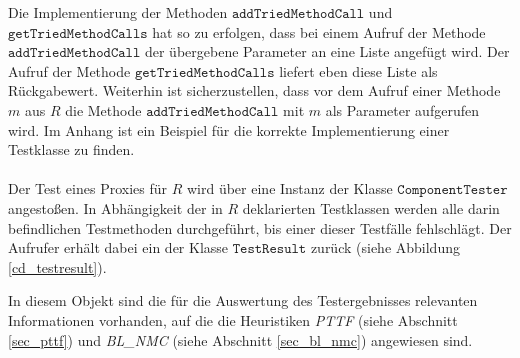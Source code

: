 \begin{figure}

\end{figure}\label{cd_ctSPI}
\noindent
Die Implementierung der Methoden $\texttt{addTriedMethodCall}$ und $\texttt{getTriedMethodCalls}$ hat so zu erfolgen, dass bei einem Aufruf der Methode $\texttt{addTriedMethodCall}$ der übergebene Parameter an eine Liste angefügt wird. Der Aufruf der Methode $\texttt{getTriedMethodCalls}$ liefert eben diese Liste als Rückgabewert. Weiterhin ist sicherzustellen, dass vor dem Aufruf einer Methode $m$ aus $R$ die Methode $\texttt{addTriedMethodCall}$ mit $m$ als Parameter aufgerufen wird. Im Anhang ist ein Beispiel für die korrekte Implementierung einer Testklasse zu finden.
\\\\
Der Test eines Proxies für $R$ wird über eine Instanz der Klasse $\texttt{ComponentTester}$ angestoßen. In Abhängigkeit der in $R$ deklarierten Testklassen werden alle darin befindlichen Testmethoden durchgeführt, bis einer dieser Testfälle fehlschlägt. Der Aufrufer erhält dabei ein der Klasse $\texttt{TestResult}$ zurück (siehe Abbildung \ref{cd_testresult}). 
\begin{figure}

\end{figure}\label{cd_testresult}
\noindent
In diesem Objekt sind die für die Auswertung des Testergebnisses relevanten Informationen vorhanden, auf die die Heuristiken \emph{PTTF} (siehe Abschnitt \ref{sec_pttf}) und \emph{BL\_NMC} (siehe Abschnitt \ref{sec_bl_nmc}) angewiesen sind.


